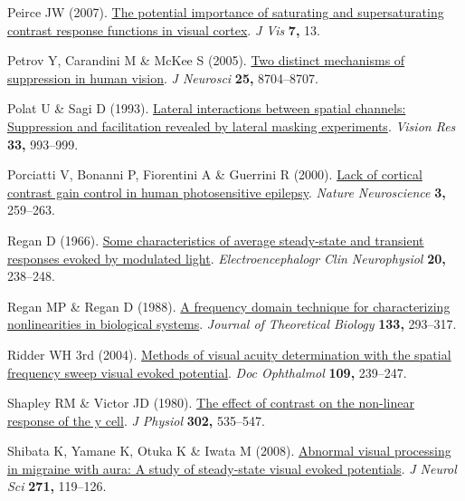 \documentclass[
  letterpaper,
  DIV=11,
  numbers=noendperiod]{scrartcl}
\newlength{\cslhangindent}
\newenvironment{CSLReferences}[2] %
 {\begin{list}{}{%
  \setlength{\itemindent}{0pt}
  \setlength{\leftmargin}{0pt}
  \setlength{\parsep}{0pt}
  \ifodd #1
   \setlength{\leftmargin}{\cslhangindent}
   \setlength{\itemindent}{-1\cslhangindent}
  \fi
  \setlength{\itemsep}{#2\baselineskip}}}
 {\end{list}}
\begin{document}
\begin{CSLReferences}{1}{1}
Peirce JW (2007). \href{https://doi.org/10.1167/7.6.13}{The potential
importance of saturating and supersaturating contrast response functions
in visual cortex}. \emph{J Vis} \textbf{7,} 13.

Petrov Y, Carandini M \& McKee S (2005).
\href{https://doi.org/10.1523/JNEUROSCI.2871-05.2005}{Two distinct
mechanisms of suppression in human vision}. \emph{J Neurosci}
\textbf{25,} 8704--8707.

Polat U \& Sagi D (1993).
\href{https://doi.org/10.1016/0042-6989(93)90081-7}{Lateral interactions
between spatial channels: Suppression and facilitation revealed by
lateral masking experiments}. \emph{Vision Res} \textbf{33,} 993--999.

Porciatti V, Bonanni P, Fiorentini A \& Guerrini R (2000).
\href{https://doi.org/10.1038/72972}{Lack of cortical contrast gain
control in human photosensitive epilepsy}. \emph{Nature Neuroscience}
\textbf{3,} 259--263.

Regan D (1966). \href{https://doi.org/10.1016/0013-4694(66)90088-5}{Some
characteristics of average steady-state and transient responses evoked
by modulated light}. \emph{Electroencephalogr Clin Neurophysiol}
\textbf{20,} 238--248.

Regan MP \& Regan D (1988).
\href{https://doi.org/10.1016/S0022-5193(88)80323-0}{A frequency domain
technique for characterizing nonlinearities in biological systems}.
\emph{Journal of Theoretical Biology} \textbf{133,} 293--317.

Ridder WH 3rd (2004).
\href{https://doi.org/10.1007/s10633-004-8053-7}{Methods of visual
acuity determination with the spatial frequency sweep visual evoked
potential}. \emph{Doc Ophthalmol} \textbf{109,} 239--247.

Shapley RM \& Victor JD (1980).
\href{https://doi.org/10.1113/jphysiol.1980.sp013259}{The effect of
contrast on the non-linear response of the y cell}. \emph{J Physiol}
\textbf{302,} 535--547.

Shibata K, Yamane K, Otuka K \& Iwata M (2008).
\href{https://doi.org/10.1016/j.jns.2008.04.004}{Abnormal visual
processing in migraine with aura: A study of steady-state visual evoked
potentials}. \emph{J Neurol Sci} \textbf{271,} 119--126.


\end{CSLReferences}
\end{document}

